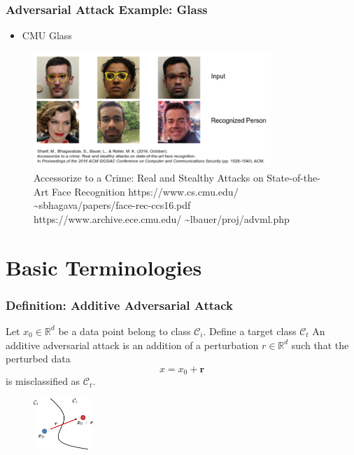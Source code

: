 \documentclass[9pt,dvipsnames]{beamer}
\newenvironment{customtheorem}[1]
{%
	\tcolorbox[
	enhanced,
	colback=blue!5,
	colframe=blue!60!black,
	coltitle=black,
	colbacktitle=blue!5,
	fonttitle=\bfseries,
	attach boxed title to top left={yshift=-2mm, xshift=2mm},
	boxed title style={sharp corners},
	sharp corners,
	title=#1
	]
}
{%
	\endtcolorbox
}
\begin{document}
\begin{frame}
	\frametitle{Adversarial Attack Example: Glass}
	\begin{itemize}
		\item CMU Glass
	\end{itemize}
	\begin{figure}[htbp]
		\centering
		\includegraphics[width=0.8\textwidth]{imgs/adv_overview_8.png}
		\caption{Accessorize to a Crime: Real and Stealthy Attacks on State-of-the-Art Face Recognition 
			https://www.cs.cmu.edu/ \sim sbhagava/papers/face-rec-ccs16.pdf https://www.archive.ece.cmu.edu/ \sim lbauer/proj/advml.php}
	\end{figure}
\end{frame}

\section{Basic Terminologies}
\begin{frame}
	\frametitle{Definition: Additive Adversarial Attack}
	\begin{customtheorem}{Additive Adversarial Attack}
Let \(x_{0} \in \mathbb{R}^{d}\) be a data point belong to class \(\mathcal{C}_{i}\). Define a target class \(\mathcal{C}_{t}\)
An additive adversarial attack is an addition of a perturbation \(r \in \mathbb{R}^{d}\)
such that the perturbed data
$$
x=x_{0}+\boldsymbol{r}
$$
is misclassified as \(\mathcal{C}_{t}\).
	\end{customtheorem}
	\begin{figure}[htbp]
		\centering
		\includegraphics[width=0.2\textwidth]{imgs/adv_overview_9.png}
	\end{figure}
\end{frame}
\end{document}
